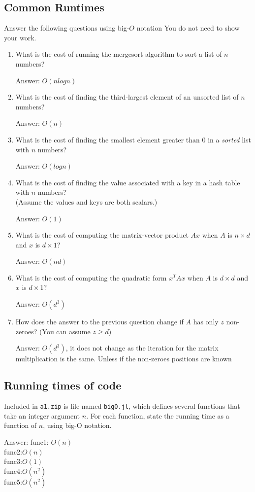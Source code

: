 \documentclass{article}
\def\ans#1{\par\gre{Answer: #1}}
\def\blu#1{{\color{blu}#1}}
\def\gre#1{{\color{gre}#1}}
\begin{document}
\pagebreak

\subsection{Common Runtimes}

\blu{Answer the following questions using big-$O$ notation} You do not need to show your work.
\begin{enumerate}
\item What is the cost of running the mergesort algorithm to sort  a list of $n$ numbers?
\ans{$O(nlogn)$}
\item What is the cost of finding the third-largest element of an unsorted list of $n$ numbers?
\ans{$O(n)$}
\item What is the cost of finding the smallest element greater than 0 in a \emph{sorted} list with $n$ numbers?
\ans{$O(logn)$}
\item What is the cost of finding the value associated with a key in a hash table with $n$ numbers? \\(Assume the values and keys are both scalars.)
\ans{$O(1)$}
\item What is the cost of computing the matrix-vector product $Ax$ when $A$ is $n \times d$ and $x$ is $d \times 1$?
\ans{$O(nd)$}
\item What is the cost of computing the quadratic form $x^TAx$ when $A$ is $d \times d$ and $x$ is $d \times 1$?
\ans{$O(d^3)$}
\item How does the answer to the previous question change if $A$ has only $z$ non-zeroes? (You can assume $z \geq d$)
\ans{$O(d^3)$, it does not change as the iteration for the matrix multiplication is the same. Unless if the non-zeroes positions are known}
\end{enumerate}

\pagebreak

\subsection{Running times of code}

Included in \texttt{a1.zip} is file named \texttt{bigO.jl}, which defines several functions
that take an integer argument $n$. For each function, \blu{state the running time as a function of $n$, using big-O notation}.

\ans{func1: $O(n)$ \\
func2:$O(n)$\\
func3:$O(1)$\\
func4:$O(n^2)$\\
func5:$O(n^2)$}
\pagebreak
\end{document}
